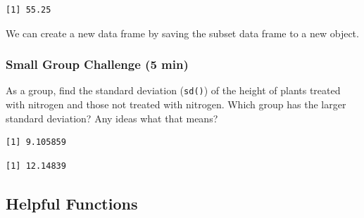\documentclass[
  letterpaper,
  DIV=11,
  numbers=noendperiod]{scrartcl}
\newenvironment{Shaded}{\begin{snugshade}}{\end{snugshade}}
\newcommand{\DecValTok}[1]{\textcolor[rgb]{0.68,0.00,0.00}{#1}}
\newcommand{\FunctionTok}[1]{\textcolor[rgb]{0.28,0.35,0.67}{#1}}
\newcommand{\NormalTok}[1]{\textcolor[rgb]{0.00,0.23,0.31}{#1}}
\newcommand{\OtherTok}[1]{\textcolor[rgb]{0.00,0.23,0.31}{#1}}
\newcommand{\SpecialCharTok}[1]{\textcolor[rgb]{0.37,0.37,0.37}{#1}}
\newcommand{\StringTok}[1]{\textcolor[rgb]{0.13,0.47,0.30}{#1}}
\begin{document}
\begin{verbatim}
[1] 55.25
\end{verbatim}

We can create a new data frame by saving the subset data frame to a new
object.

\begin{Shaded}
\end{Shaded}

\subsubsection{Small Group Challenge (5
min)}\label{small-group-challenge-5-min}

As a group, find the standard deviation (\texttt{sd()}) of the height of
plants treated with nitrogen and those not treated with nitrogen. Which
group has the larger standard deviation? Any ideas what that means?

\begin{Shaded}
\end{Shaded}

\begin{verbatim}
[1] 9.105859
\end{verbatim}

\begin{Shaded}
\end{Shaded}

\begin{verbatim}
[1] 12.14839
\end{verbatim}

\subsection{Helpful Functions}\label{helpful-functions}
\end{document}
